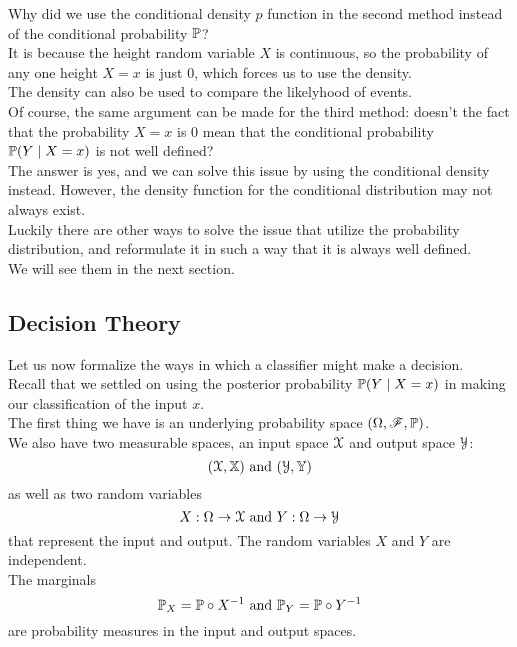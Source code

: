 \documentclass[12pt]{article}
\begin{document}
Why did we use the conditional
density $p$ function
in the second method instead of
the conditional probability $\mathbb{P}$? \\
It is because the height random variable
$X$ is continuous,
so the probability of any one
height $X = x$ is just $0$,
which forces us to use the density. \\
The density can also be used to compare
the likelyhood of events. \\

Of course, the same argument
can be made for the third method:
doesn't the fact that the probability
$X = x$ is $0$
mean that the conditional
probability $\mathbb{P}(Y \mid X = x)$
is not well defined? \\
The answer is yes,
and we can solve this issue by using
the conditional density instead.
However, the density function
for the conditional distribution
may not always exist. \\
Luckily there are other ways to solve 
the issue that utilize the probability
distribution, and reformulate it in
such a way that it is always well
defined. \\
We will see them in the next section. \\

\newpage

\subsection*{Decision Theory}

Let us now formalize the ways
in which a classifier might
make a decision. \\
Recall that we settled on using
the posterior probability
$\mathbb{P}(Y \mid X = x)$
in making our classification
of the input $x$. \\

The first thing we have
is an underlying probability
space
$(\Omega, \mathscr{F}, \mathbb{P})$. \\

We also have two measurable
spaces, an input space $\mathcal{X}$
and output space $\mathcal{Y}$:
\[ (\mathcal{X}, \mathbb{X}) \text{ and } (\mathcal{Y}, \mathbb{Y}) \]
as well as two random variables
\[ X: \Omega \to \mathcal{X} \text{ and } 
Y: \Omega \to \mathcal{Y} \]
that represent the input
and output.
The random variables $X$ and $Y$
are independent. \\

The marginals
\[ \mathbb{P}_X = \mathbb{P} \circ X^{-1} 
\text{ and } \mathbb{P}_Y = \mathbb{P} \circ Y^{-1} \]
are probability measures
in the input and output spaces. \\
\end{document}
